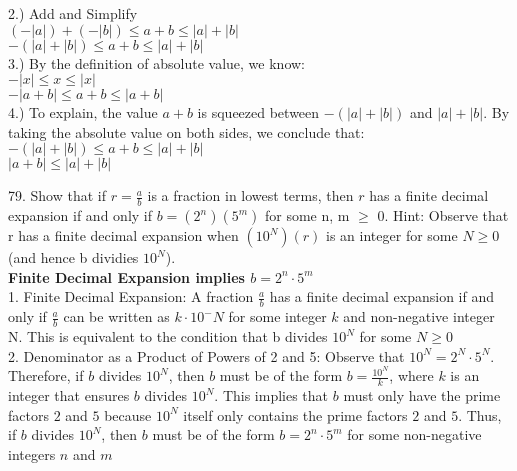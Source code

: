 \documentclass{article}
\begin{document}
2.) Add and Simplify\\
\indent$(-\left|a\right|)+(-\left| b\right|) \leq a + b \leq \left|a\right| + \left|b\right|$\\
\indent$-(\left|a\right| + \left|b\right|) \leq a + b \leq \left|a\right| + \left|b\right|$\\

3.) By the definition of absolute value, we know:\\
\indent$-\left|x\right| \leq x \leq \left|x\right|$\\
\indent$-\left|a+b\right| \leq a+b \leq \left|a+b\right|$\\

4.) To explain, the value $a + b$ is squeezed between $-(\left|a\right| + \left|b\right|)$ and $\left|a\right| + \left|b\right|$. By taking the absolute value on both sides, we conclude that: \\
\indent$-(\left|a\right| + \left|b\right|) \leq a + b \leq \left|a\right| + \left|b\right|$\\
\indent$\left|a + b\right| \leq \left|a\right| + \left|b\right|$\\

\newpage

79. Show that if $r=\frac{a}{b}$ is a fraction in lowest terms, then $r$ has a finite decimal expansion if and only if $b = (2^n)(5^m)$ for some n, m $\geq$ 0. Hint: Observe that r has a finite decimal expansion when $(10^N)(r)$ is an integer for some $N\geq0$ (and hence b dividies $10^N$).\\

\textbf{Finite Decimal Expansion implies $b = 2^n \cdot 5^m$}\\

1. Finite Decimal Expansion: A fraction $\frac{a}{b}$ has a finite decimal expansion if and only if $\frac{a}{b}$ can be written as $k \cdot 10^-N$ for some integer $k$ and non-negative integer N. This is equivalent to the condition that b divides $10^N$ for some $N \geq 0$\\

2. Denominator as a Product of Powers of 2 and 5: Observe that $10^N = 2^N \cdot 5^N$. Therefore, if $b$ divides $10^N$, then $b$ must be of the form $b = \frac{10^N}{k}$, where $k$ is an integer that ensures $b$ divides $10^N$. This implies that $b$ must only have the prime factors $2$ and $5$ because $10^N$ itself only contains the prime factors $2$ and $5$. Thus, if $b$ divides $10^N$, then $b$ must be of the form $b = 2^n \cdot 5^m$ for some non-negative integers $n$ and $m$\\
\end{document}
